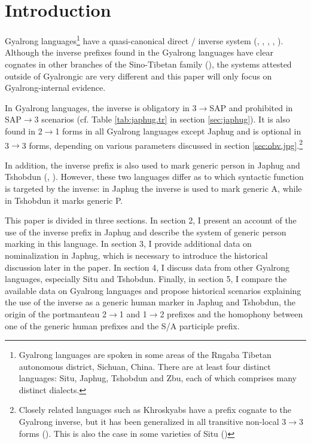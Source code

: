 \documentclass[oneside,a4paper,11pt]{article}
\begin{document}
\section{Introduction}
Gyalrong languages\footnote{Gyalrong languages are spoken in some areas of the Rngaba Tibetan autonomous district, Sichuan, China. There are at least four distinct languages: Situ, Japhug, Tshobdun and Zbu, each of which comprises many distinct dialects.} have a quasi-canonical direct / inverse system (\citealt{delancey81direction}, \citealt{jackson02rentongdengdi}, \citealt{jacques10inverse}, \citealt{gongxun14agreement}, \citealt{jacques14inverse}). Although the inverse prefixes found in the Gyalrong languages have  clear cognates  in other branches of the Sino-Tibetan family (\citealt{delancey10agreement}), the systems attested outside of Gyalrongic are very different and this paper will only focus on Gyalrong-internal evidence.

In Gyalrong languages, the inverse is obligatory in 3$\rightarrow$SAP and prohibited in SAP$\rightarrow$3 scenarios (cf. Table \ref{tab:japhug.tr} in section \ref{sec:japhug}). It is also found in  2$\rightarrow$1 forms in all Gyalrong languages except Japhug and is optional in 3$\rightarrow$3 forms, depending on various parameters discussed  in section \ref{sec:obv.jpg}.\footnote{Closely related languages such as Khroskyabs have a prefix cognate to the Gyalrong inverse, but it has been generalized in all transitive non-local 3$\rightarrow$3 forms (\citealt{lai15person}). This is also the case in some varieties of Situ (\citealt{jackson15sastod})}

In addition, the inverse prefix is also used to mark generic person in Japhug and Tshobdun  (\citealt{jacques12demotion}, \citealt{sun14generic}). However, these two languages differ as to which syntactic function is targeted by the inverse: in Japhug the inverse is used to mark generic A, while in Tshobdun it marks generic P. 

  This paper is divided in three sections. In section 2, I present an account of the use of the inverse prefix in Japhug and describe the system of generic person marking in this language. In section 3, I provide additional data on nominalization in Japhug, which is necessary to introduce the historical discussion later in the paper. In section 4, I discuss data from other Gyalrong languages, especially Situ and Tshobdun. Finally, in section 5, I compare the available data on Gyalrong languages and propose historical scenarios explaining the use of the inverse as a generic human marker in Japhug and Tshobdun, the origin of the portmanteau 2$\rightarrow$1 and 1$\rightarrow$2 prefixes and the homophony between one of the generic human prefixes and the S/A participle prefix.
  
\end{document}
